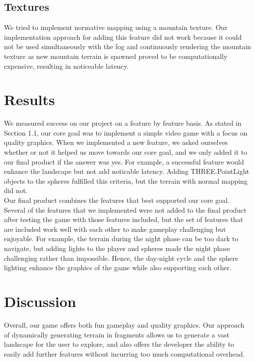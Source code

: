 \documentclass{article}
\begin{document}
\subsection{Textures}
We tried to implement normative mapping using a mountain texture.  Our implementation approach for adding this feature did not work because it could not be used simultaneously with the fog and continuously rendering the mountain texture as new mountain terrain is spawned proved to be computationally expensive, resulting in noticeable latency.

\section{Results}
We measured success on our project on a feature by feature basis.  As stated in Section 1.1, our core goal was to implement a simple video game with a focus on quality graphics.  When we implemented a new feature, we asked ourselves whether or not it helped us move towards our core goal, and we only added it to our final product if the answer was yes.  For example, a successful feature would enhance the landscape but not add noticable latency. Adding THREE.PointLight objects to the spheres fulfilled this criteria, but the terrain with normal mapping did not.\\

Our final product combines the features that best supported our core goal.  Several of the features that we implemented were not added to the final product after testing the game with those features included, but the set of features that are included work well with each other to make gameplay challenging but enjoyable. For example, the terrain during the night phase can be too dark to navigate, but adding lights to the player and spheres made the night phase challenging rather than impossible.  Hence, the day-night cycle and the sphere lighting enhance the graphics of the game while also supporting each other.

%

\section{Discussion}
Overall, our game offers both fun gameplay and quality graphics. Our approach of dynamically generating terrain in fragments allows us to generate a vast landscape for the user to explore, and also offers the developer the ability to easily add further features without incurring too much computational overhead.
\end{document}

